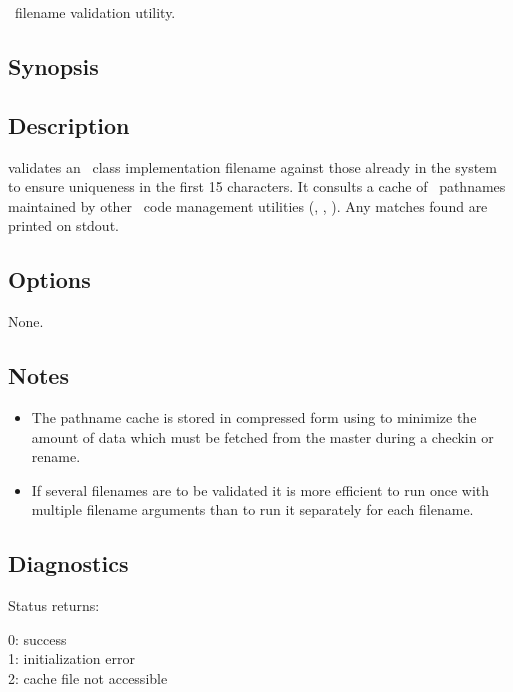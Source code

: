 \aipspp\ filename validation utility.

\subsection*{Synopsis}

\begin{synopsis}
\end{synopsis}

\subsection*{Description}

 validates an \aipspp\ class implementation filename against those
already in the system to ensure uniqueness in the first 15 characters.  It
consults a cache of \aipspp\ pathnames maintained by other \aipspp\ 
code management utilities (, , ).  Any
matches found are printed on stdout.

\subsection*{Options}

None.

\subsection*{Notes}

\begin{itemize}
\item
   The pathname cache is stored in compressed form using  to
   minimize the amount of data which must be fetched from the master during a
   checkin or rename.

\item
   If several filenames are to be validated it is more efficient to run
   \exe{av} once with multiple filename arguments than to run it separately
   for each filename.
\end{itemize}

\subsection*{Diagnostics}

Status returns:
\begin{status}
   0: success\\
   1: initialization error\\
   2: cache file not accessible
\end{status}

